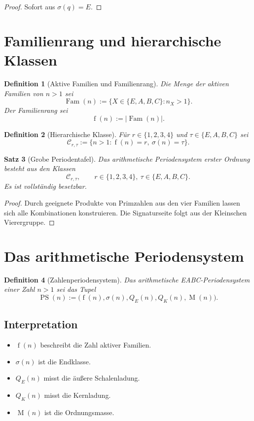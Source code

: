 \documentclass[12pt,a4paper]{article}
\newtheorem{satz}{Satz}[section]
\newtheorem{definition}[satz]{Definition}
\newcommand{\Fam}{\operatorname{Fam}}
\newcommand{\sign}{\sigma}
\newcommand{\Mass}{\operatorname{M}}
\newcommand{\QE}{Q_E}
\newcommand{\QK}{Q_K}
\newcommand{\rank}{\operatorname{f}}
\newcommand{\PS}{\operatorname{PS}}
\begin{document}
	\begin{proof}
		Sofort aus $\sign(q)=E$.
	\end{proof}
	
	\section{Familienrang und hierarchische Klassen}
	
	\begin{definition}[Aktive Familien und Familienrang]
		Die Menge der aktiven Familien von $n>1$ sei
		\[
		\Fam(n):=\{X\in\{E,A,B,C\}: n_X>1\}.
		\]
		Der \emph{Familienrang} sei
		\[
		\rank(n):=|\Fam(n)|.
		\]
	\end{definition}
	
	\begin{definition}[Hierarchische Klasse]
		Für $r\in\{1,2,3,4\}$ und $\tau\in\{E,A,B,C\}$ sei
		\[
		\mathcal C_{r,\tau}:=\{n>1:\rank(n)=r,\ \sign(n)=\tau\}.
		\]
	\end{definition}
	
	\begin{satz}[Grobe Periodentafel]
		Das arithmetische Periodensystem erster Ordnung besteht aus den Klassen
		\[
		\mathcal C_{r,\tau},
		\qquad
		r\in\{1,2,3,4\},\ \tau\in\{E,A,B,C\}.
		\]
		Es ist vollständig besetzbar.
	\end{satz}
	
	\begin{proof}
		Durch geeignete Produkte von Primzahlen aus den vier Familien lassen sich alle Kombinationen konstruieren. Die Signaturseite folgt aus der Kleinschen Vierergruppe.
	\end{proof}
	
	\section{Das arithmetische Periodensystem}
	
	\begin{definition}[Zahlenperiodensystem]
		Das \emph{arithmetische EABC-Periodensystem} einer Zahl $n>1$ sei das Tupel
		\[
		\PS(n):=\bigl(\rank(n),\sign(n),\QE(n),\QK(n),\Mass(n)\bigr).
		\]
	\end{definition}
	
	\subsection*{Interpretation}
	\begin{itemize}
		\item $\rank(n)$ beschreibt die Zahl aktiver Familien.
		\item $\sign(n)$ ist die Endklasse.
		\item $\QE(n)$ misst die äußere Schalenladung.
		\item $\QK(n)$ misst die Kernladung.
		\item $\Mass(n)$ ist die Ordnungsmasse.
	\end{itemize}
	
\end{document}
